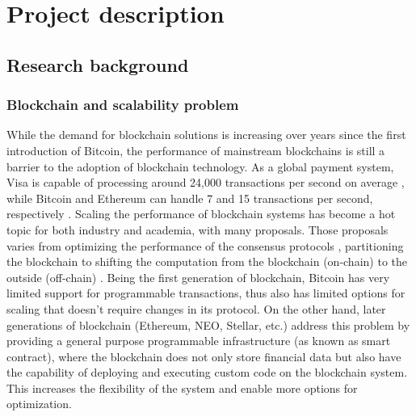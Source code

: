 \newpage
\section{Project description}

\subsection{Research background}

\subsubsection{Blockchain and scalability problem}
While the demand for blockchain solutions is increasing over years since the
first introduction of Bitcoin, the performance of mainstream blockchains is
still a barrier to the adoption of blockchain technology. As a global payment
system, Visa is capable of processing around 24,000 transactions per second on
average \cite{visa}, while Bitcoin and Ethereum can handle 7 and 15 transactions per second, 
respectively \cite{ethereum:sharding, nakamoto2019bitcoin}. Scaling the
performance of blockchain systems has become a hot topic for both industry and
academia, with many proposals. Those proposals varies from optimizing the
performance of the consensus protocols \cite{dang2019towards}, partitioning the
blockchain \cite{wang2019sok} to shifting the computation from the blockchain
(on-chain) to the outside (off-chain) \cite{teutsch2019scalable,
network2018cheap}. Being the first generation of blockchain, Bitcoin has very
limited support for programmable transactions, thus also has limited options for
scaling that doesn't require changes in its protocol. On the other hand, later
generations of blockchain (Ethereum, NEO, Stellar, etc.) address this problem by
providing a general purpose programmable infrastructure (as known as smart
contract), where the blockchain does not only store financial data but also have
the capability of deploying and executing custom code on the blockchain system.
This increases the flexibility of the system and enable more options for
optimization.

